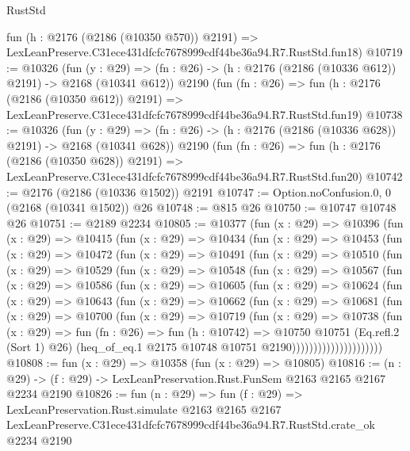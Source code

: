 \begin{lexlean}{RustStd}
\begin{coremodule}
    fun (h : @2176 (@2186 (@10350 @570)) @2191) =>
    LexLeanPreserve.C31ece431dfcfc7678999cdf44be36a94.R7.RustStd.fun18)
@10719 := @10326
    (fun (y : @29) => (fn : @26) -> (h : @2176 (@2186 (@10336 @612)) @2191) -> @2168 (@10341 @612))
    @2190
    (fun (fn : @26) =>
    fun (h : @2176 (@2186 (@10350 @612)) @2191) =>
    LexLeanPreserve.C31ece431dfcfc7678999cdf44be36a94.R7.RustStd.fun19)
@10738 := @10326
    (fun (y : @29) => (fn : @26) -> (h : @2176 (@2186 (@10336 @628)) @2191) -> @2168 (@10341 @628))
    @2190
    (fun (fn : @26) =>
    fun (h : @2176 (@2186 (@10350 @628)) @2191) =>
    LexLeanPreserve.C31ece431dfcfc7678999cdf44be36a94.R7.RustStd.fun20)
@10742 := @2176 (@2186 (@10336 @1502)) @2191
@10747 := Option.noConfusion.{0, 0} (@2168 (@10341 @1502)) @26
@10748 := @815 @26
@10750 := @10747 @10748 @26
@10751 := @2189 @2234
@10805 := @10377
    (fun (x : @29) =>
    @10396
      (fun (x : @29) =>
      @10415
        (fun (x : @29) =>
        @10434
          (fun (x : @29) =>
          @10453
            (fun (x : @29) =>
            @10472
              (fun (x : @29) =>
              @10491
                (fun (x : @29) =>
                @10510
                  (fun (x : @29) =>
                  @10529
                    (fun (x : @29) =>
                    @10548
                      (fun (x : @29) =>
                      @10567
                        (fun (x : @29) =>
                        @10586
                          (fun (x : @29) =>
                          @10605
                            (fun (x : @29) =>
                            @10624
                              (fun (x : @29) =>
                              @10643
                                (fun (x : @29) =>
                                @10662
                                  (fun (x : @29) =>
                                  @10681
                                    (fun (x : @29) =>
                                    @10700
                                      (fun (x : @29) =>
                                      @10719
                                        (fun (x : @29) =>
                                        @10738
                                          (fun (x : @29) =>
                                          fun (fn : @26) =>
                                          fun (h : @10742) =>
                                          @10750
                                            @10751
                                            (Eq.refl.{2} (Sort 1) @26)
                                            (heq_of_eq.{1}
                                              @2175
                                              @10748
                                              @10751
                                              @2190)))))))))))))))))))))
@10808 := fun (x : @29) => @10358 (fun (x : @29) => @10805)
@10816 := (n : @29) -> (f : @29) -> LexLeanPreservation.Rust.FunSem @2163 @2165 @2167 @2234 @2190
@10826 := fun (n : @29) =>
  fun (f : @29) =>
  LexLeanPreservation.Rust.simulate
    @2163
    @2165
    @2167
    LexLeanPreserve.C31ece431dfcfc7678999cdf44be36a94.R7.RustStd.crate_ok
    @2234
    @2190
\end{coremodule}
\end{lexlean}
